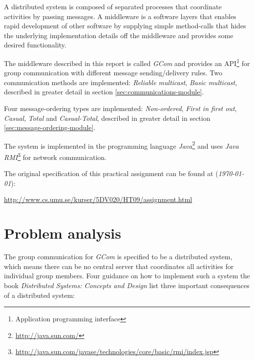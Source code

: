 \documentclass[titlepage, twocolumn, a4paper, 10pt]{article}
\begin{document}
A distributed system is composed of separated processes that
coordinate activities by passing messages. A middleware is a software
layers that enables rapid development of other software by supplying
simple method-calls that hides the underlying implementation details
off the middleware and provides some desired functionality.

The middleware described in this report is called \textit{GCom} and
provides an API\footnote{Application programming interface} for group
communication with different message sending/delivery rules. Two
communication methods are implemented: \textit{Reliable multicast},
\textit{Basic multicast}, described in greater detail in section
\ref{sec:communications-module}.

Four message-ordering types are implemented: \textit{Non-ordered},
\textit{First in first out}, \textit{Casual}, \textit{Total} and
\textit{Casual-Total}, described in greater detail in section
\ref{sec:message-ordering-module}.

The system is implemented in the programming language
\textit{Java}\footnote{\url{http://java.sun.com/}} and uses \textit{Java
  RMI}\footnote{\url{http://java.sun.com/javase/technologies/core/basic/rmi/index.jsp}}
for network communication.

The original specification of this practical assignment can be found
at (\textit{\today}):\\
\begin{footnotesize}
  \url{http://www.cs.umu.se/kurser/5DV020/HT09/assignment.html}
\end{footnotesize}

\section{Problem analysis}\label{sec:problem-analysis}
The group communication for \textit{GCom} is specified to be a
distributed system, which means there can be no central server that
coordinates all activities for individual group members. Four guidance
on how to implement such a system the book \textit{Distributed
  Systems: Concepts and Design}\cite{book:dist-syst} list three
important consequences of a distributed system:
\end{document}
